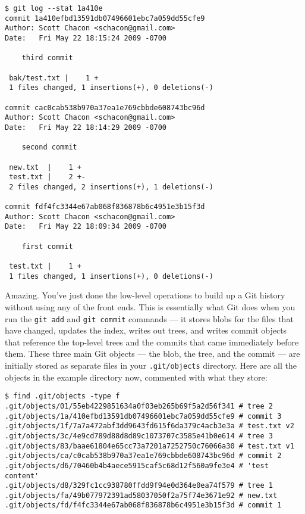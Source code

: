 \documentclass[a4paper]{book}
\begin{document}
\begin{shaded}\begin{verbatim}
$ git log --stat 1a410e
commit 1a410efbd13591db07496601ebc7a059dd55cfe9
Author: Scott Chacon <schacon@gmail.com>
Date:   Fri May 22 18:15:24 2009 -0700

    third commit

 bak/test.txt |    1 +
 1 files changed, 1 insertions(+), 0 deletions(-)

commit cac0cab538b970a37ea1e769cbbde608743bc96d
Author: Scott Chacon <schacon@gmail.com>
Date:   Fri May 22 18:14:29 2009 -0700

    second commit

 new.txt  |    1 +
 test.txt |    2 +-
 2 files changed, 2 insertions(+), 1 deletions(-)

commit fdf4fc3344e67ab068f836878b6c4951e3b15f3d
Author: Scott Chacon <schacon@gmail.com>
Date:   Fri May 22 18:09:34 2009 -0700

    first commit

 test.txt |    1 +
 1 files changed, 1 insertions(+), 0 deletions(-)
\end{verbatim}\end{shaded}

Amazing. You've just done the low-level operations to build up a Git history without using any of the front ends. This is essentially what Git does when you run the \texttt{git add} and \texttt{git commit} commands --- it stores blobs for the files that have changed, updates the index, writes out trees, and writes commit objects that reference the top-level trees and the commits that came immediately before them. These three main Git objects --- the blob, the tree, and the commit --- are initially stored as separate files in your \texttt{.git/objects} directory. Here are all the objects in the example directory now, commented with what they store:

\begin{shaded}\begin{verbatim}
$ find .git/objects -type f
.git/objects/01/55eb4229851634a0f03eb265b69f5a2d56f341 # tree 2
.git/objects/1a/410efbd13591db07496601ebc7a059dd55cfe9 # commit 3
.git/objects/1f/7a7a472abf3dd9643fd615f6da379c4acb3e3a # test.txt v2
.git/objects/3c/4e9cd789d88d8d89c1073707c3585e41b0e614 # tree 3
.git/objects/83/baae61804e65cc73a7201a7252750c76066a30 # test.txt v1
.git/objects/ca/c0cab538b970a37ea1e769cbbde608743bc96d # commit 2
.git/objects/d6/70460b4b4aece5915caf5c68d12f560a9fe3e4 # 'test content'
.git/objects/d8/329fc1cc938780ffdd9f94e0d364e0ea74f579 # tree 1
.git/objects/fa/49b077972391ad58037050f2a75f74e3671e92 # new.txt
.git/objects/fd/f4fc3344e67ab068f836878b6c4951e3b15f3d # commit 1
\end{verbatim}\end{shaded}
\end{document}
